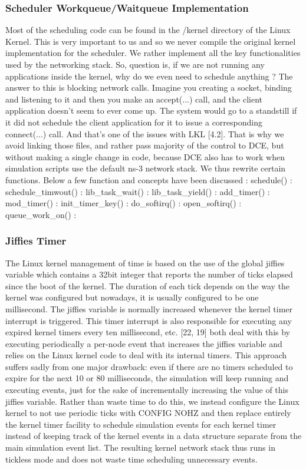 \documentclass{sig-alternate}
\begin{document}
\subsubsection{Scheduler Workqueue/Waitqueue Implementation}
Most of the scheduling code can be found in the /kernel directory of the Linux Kernel. This is very important to us and so we never compile the 
original kernel implementation for the scheduler. We rather implement all the key functionalities used by the networking stack. So, 
question is, if we are not running any applications inside the kernel, why do we even need to schedule anything ? The answer to this is 
blocking network calls. Imagine you creating a socket, binding and listening to it and then you make an accept(...) call, and the client 
application doesn’t seem to ever come up. The system would go to a standstill if it did not schedule the client application for it to issue a 
corresponding connect(...) call. And that’s one of the issues with LKL [4.2]. That is why we avoid linking those files, and rather pass 
majority of the control to DCE, but without making a single change in code, because DCE also has to work when simulation scripts use the 
default ns-3 network stack. We thus rewrite certain functions. Below a few function and concepts have been discussed : 
schedule() : 
schedule\_timwout() :
lib\_task\_wait() :
lib\_task\_yield() : 
add\_timer() : 
mod\_timer() :
init\_timer\_key() :
do\_softirq() :
open\_softirq() :
queue\_work\_on() :

\subsubsection{Jiffies Timer}
The Linux kernel management of time is based on the use of the global jiffies variable
which contains a 32bit integer that reports the number of ticks elapsed since the boot of
the kernel. The duration of each tick depends on the way the kernel was configured but
nowadays, it is usually configured to be one millisecond. The jiffies variable is normally
increased whenever the kernel timer interrupt is triggered. This timer interrupt is also
responsible for executing any expired kernel timers every ten millisecond, etc.
[22, 19] both deal with this by executing periodically a per-node event that increases
the jiffies variable and relies on the Linux kernel code to deal with its internal timers. This
approach suffers sadly from one major drawback: even if there are no timers scheduled to
expire for the next 10 or 80 milliseconds, the simulation will keep running and executing
events, just for the sake of incrementally increasing the value of this jiffies variable.
Rather than waste time to do this, we instead configure the Linux kernel to not use periodic
ticks with CONFIG NOHZ and then replace entirely the kernel timer facility to schedule
simulation events for each kernel timer instead of keeping track of the kernel events in a
data structure separate from the main simulation event list. The resulting kernel network
stack thus runs in tickless mode and does not waste time scheduling unnecessary events.
\end{document}
